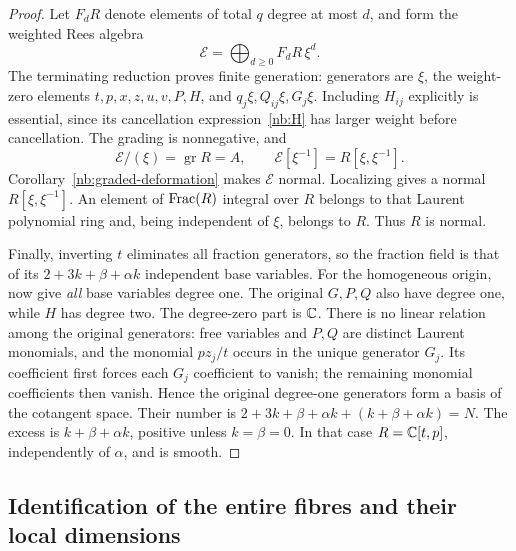 \begin{proof}
Let $F_dR$ denote elements of total $q$ degree at most $d$, and form
the weighted Rees algebra
\[
 \mathcal E=\bigoplus_{d\geq0}F_dR\,\xi^d.
\]
The terminating reduction proves finite generation: generators are
$\xi$, the weight-zero elements $t,p,x,z,u,v,P,H$, and
$q_j\xi,Q_{ij}\xi,G_j\xi$. Including $H_{ij}$ explicitly is
essential, since its cancellation expression~\eqref{nb:H} has
larger weight before cancellation. The grading is nonnegative, and
\[
 \mathcal E/(\xi)=\operatorname{gr}R=A,\qquad
 \mathcal E[\xi^{-1}]=R[\xi,\xi^{-1}].
\]
Corollary~\ref{nb:graded-deformation} makes $\mathcal E$ normal.
Localizing gives a normal $R[\xi,\xi^{-1}]$. An element of
$\operatorname{Frac}(R)$ integral over $R$ belongs to that Laurent polynomial
ring and, being independent of $\xi$, belongs to $R$. Thus $R$
is normal.

Finally, inverting $t$ eliminates all fraction generators, so the
fraction field is that of its $2+3k+\beta+\alpha k$ independent
base variables. For the homogeneous origin, now give \emph{all}
base variables degree one. The original $G,P,Q$ also have degree
one, while $H$ has degree two. The degree-zero part is $\mathbb C$.
There is no linear relation among the original generators: free
variables and $P,Q$ are distinct Laurent monomials, and the monomial
$pz_j/t$ occurs in the unique generator $G_j$. Its coefficient
first forces each $G_j$ coefficient to vanish; the remaining
monomial coefficients then vanish. Hence the original degree-one
generators form a basis of the cotangent space. Their number is
$2+3k+\beta+\alpha k+(k+\beta+\alpha k)=N$. The excess is
$k+\beta+\alpha k$, positive unless $k=\beta=0$. In that case
$R=\mathbb C[t,p]$, independently of $\alpha$, and is smooth.
\end{proof}

\subsection{Identification of the entire fibres and their local dimensions}
\label{nb:completion}

